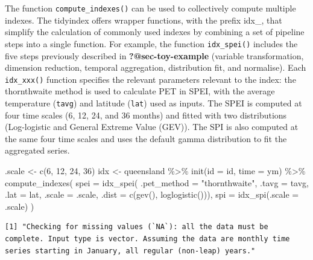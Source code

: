 \documentclass[
]{interact}
\newenvironment{Shaded}{\begin{snugshade}}{\end{snugshade}}
\newcommand{\AttributeTok}[1]{\textcolor[rgb]{0.40,0.45,0.13}{#1}}
\newcommand{\DecValTok}[1]{\textcolor[rgb]{0.68,0.00,0.00}{#1}}
\newcommand{\FunctionTok}[1]{\textcolor[rgb]{0.28,0.35,0.67}{#1}}
\newcommand{\NormalTok}[1]{\textcolor[rgb]{0.00,0.23,0.31}{#1}}
\newcommand{\OtherTok}[1]{\textcolor[rgb]{0.00,0.23,0.31}{#1}}
\newcommand{\SpecialCharTok}[1]{\textcolor[rgb]{0.37,0.37,0.37}{#1}}
\newcommand{\StringTok}[1]{\textcolor[rgb]{0.13,0.47,0.30}{#1}}
\begin{document}
The function \texttt{compute\_indexes()} can be used to collectively
compute multiple indexes. The tidyindex offers wrapper functions, with
the prefix idx\_, that simplify the calculation of commonly used indexes
by combining a set of pipeline steps into a single function. For
example, the function \texttt{idx\_spei()} includes the five steps
previously described in \textbf{?@sec-toy-example} (variable
transformation, dimension reduction, temporal aggregation, distribution
fit, and normalise). Each \texttt{idx\_xxx()} function specifies the
relevant parameters relevant to the index: the thornthwaite method is
used to calculate PET in SPEI, with the average temperature
(\texttt{tavg}) and latitude (\texttt{lat}) used as inputs. The SPEI is
computed at four time scales (6, 12, 24, and 36 months) and fitted with
two distributions (Log-logistic and General Extreme Value (GEV)). The
SPI is also computed at the same four time scales and uses the default
gamma distribution to fit the aggregated series.

\begin{Shaded}
\begin{Highlighting}[]
\NormalTok{.scale }\OtherTok{\textless{}{-}} \FunctionTok{c}\NormalTok{(}\DecValTok{6}\NormalTok{, }\DecValTok{12}\NormalTok{, }\DecValTok{24}\NormalTok{, }\DecValTok{36}\NormalTok{)}
\NormalTok{idx }\OtherTok{\textless{}{-}}\NormalTok{ queensland }\SpecialCharTok{\%\textgreater{}\%}
  \FunctionTok{init}\NormalTok{(}\AttributeTok{id =}\NormalTok{ id, }\AttributeTok{time =}\NormalTok{ ym) }\SpecialCharTok{\%\textgreater{}\%}
  \FunctionTok{compute\_indexes}\NormalTok{(}
    \AttributeTok{spei =} \FunctionTok{idx\_spei}\NormalTok{(}
      \AttributeTok{.pet\_method =} \StringTok{"thornthwaite"}\NormalTok{, }\AttributeTok{.tavg =}\NormalTok{ tavg, }\AttributeTok{.lat =}\NormalTok{ lat,}
      \AttributeTok{.scale =}\NormalTok{ .scale, }\AttributeTok{.dist =} \FunctionTok{c}\NormalTok{(}\FunctionTok{gev}\NormalTok{(), }\FunctionTok{loglogistic}\NormalTok{())),}
    \AttributeTok{spi =} \FunctionTok{idx\_spi}\NormalTok{(}\AttributeTok{.scale =}\NormalTok{ .scale)}
\NormalTok{  )}
\end{Highlighting}
\end{Shaded}

\begin{verbatim}
[1] "Checking for missing values (`NA`): all the data must be complete. Input type is vector. Assuming the data are monthly time series starting in January, all regular (non-leap) years."
\end{verbatim}
\end{document}
